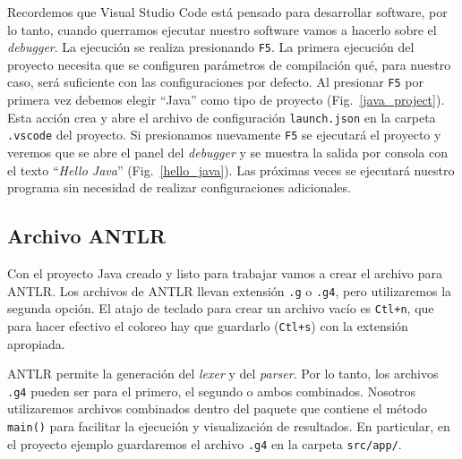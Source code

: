 \documentclass[a5paper,10pt]{article}
\begin{document}
Recordemos que Visual Studio Code está pensado para desarrollar software, por lo tanto, cuando querramos ejecutar nuestro software vamos a hacerlo sobre el \emph{debugger}.  La ejecución se realiza presionando \verb|F5|.  La primera ejecución del proyecto necesita que se configuren parámetros de compilación qué, para nuestro caso, será suficiente con las configuraciones por defecto.  Al presionar \verb|F5| por primera vez debemos elegir ``Java'' como tipo de proyecto  (Fig.~\ref{java_project}).  Esta acción crea y abre el archivo de configuración \verb|launch.json| en la carpeta \verb|.vscode| del proyecto.  Si presionamos nuevamente \verb|F5| se ejecutará el proyecto y veremos que se abre el panel del \emph{debugger} y se muestra la salida por consola con el texto ``\emph{Hello Java}'' (Fig.~\ref{hello_java}).  Las próximas veces se ejecutará nuestro programa sin necesidad de realizar configuraciones adicionales.


\subsection{Archivo ANTLR}
\label{archivo_antlr}

Con el proyecto Java creado y listo para trabajar vamos a crear el archivo para ANTLR. Los archivos de ANTLR llevan extensión \verb|.g| o \verb|.g4|, pero utilizaremos la segunda opción.  El atajo de teclado para crear un archivo vacío es \verb|Ctl+n|, que para hacer efectivo el coloreo hay que guardarlo (\verb|Ctl+s|) con la extensión apropiada.

ANTLR permite la generación del \emph{lexer} y del \emph{parser}.  Por lo tanto, los archivos \verb|.g4| pueden ser para el primero, el segundo o ambos combinados.  Nosotros utilizaremos archivos combinados dentro del paquete que contiene el método \verb|main()| para facilitar la ejecución y visualización de resultados.  En particular, en el proyecto ejemplo guardaremos el archivo \verb|.g4| en la carpeta \verb|src/app/|.
\end{document}

